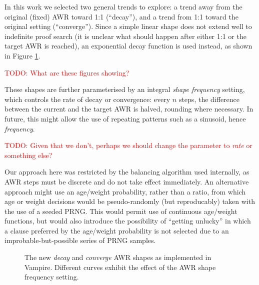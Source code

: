 \documentclass{llncs}
\newcommand{\todo}[1]{\textcolor{red}{TODO: #1}}
\begin{document}
In this work we selected two general trends to explore: a trend away from the original (fixed) AWR toward 1:1 (``decay''), and a trend from 1:1 toward the original setting (``converge'').
Since a simple linear shape does not extend well to indefinite proof search (it is unclear what should happen after either 1:1 or the target AWR is reached), an exponential decay function is used instead, as shown in Figure \ref{fig:decay-and-converge}.

\todo{What are these figures showing?}

These shapes are further parameterised by an integral \emph{shape frequency} setting, which controls the rate of decay or convergence: every \(n\) steps, the difference between the current and the target AWR is halved, rounding where necessary.
In future, this might allow the use of repeating patterns such as a sinusoid, hence \emph{frequency}.

\todo{Given that we don't, perhaps we should change the parameter to \emph{rate} or something else?}

Our approach here was restricted by the balancing algorithm used internally, as AWR steps must be discrete and do not take effect immediately.
An alternative approach might use an age/weight probability, rather than a ratio, from which age or weight decisions would be pseudo-randomly (but reproducably) taken with the use of a seeded PRNG.
This would permit use of continuous age/weight functions, but would also introduce the possibility of ``getting unlucky'' in which a clause preferred by the age/weight probability is not selected due to an improbable-but-possible series of PRNG samples.

\begin{figure}
	\caption{The new \emph{decay} and \emph{converge} AWR shapes as implemented in Vampire. Different curves exhibit the effect of the AWR shape frequency setting.}
	\label{fig:decay-and-converge}
\end{figure}
\end{document}
